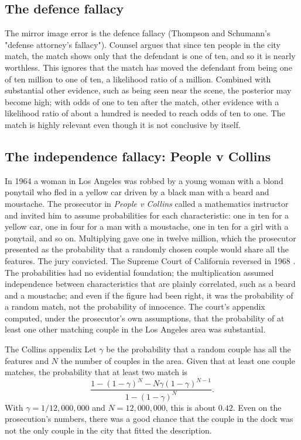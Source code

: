 \subsection{The defence fallacy}

The mirror image error is the defence fallacy (Thompson and Schumann's "defense attorney's fallacy"). Counsel argues that since ten people in the city match, the match shows only that the defendant is one of ten, and so it is nearly worthless. This ignores that the match has moved the defendant from being one of ten million to one of ten, a likelihood ratio of a million. Combined with substantial other evidence, such as being seen near the scene, the posterior may become high; with odds of one to ten after the match, other evidence with a likelihood ratio of about a hundred is needed to reach odds of ten to one. The match is highly relevant even though it is not conclusive by itself.

\subsection{The independence fallacy: People v Collins}

In 1964 a woman in Los Angeles was robbed by a young woman with a blond ponytail who fled in a yellow car driven by a black man with a beard and moustache. The prosecutor in \emph{People v Collins} called a mathematics instructor and invited him to assume probabilities for each characteristic: one in ten for a yellow car, one in four for a man with a moustache, one in ten for a girl with a ponytail, and so on. Multiplying gave one in twelve million, which the prosecutor presented as the probability that a randomly chosen couple would share all the features. The jury convicted. The Supreme Court of California reversed in 1968 \citep{collins1968}. The probabilities had no evidential foundation; the multiplication assumed independence between characteristics that are plainly correlated, such as a beard and a moustache; and even if the figure had been right, it was the probability of a random match, not the probability of innocence. The court's appendix computed, under the prosecutor's own assumptions, that the probability of at least one other matching couple in the Los Angeles area was substantial.

\begin{casebox}{The Collins appendix}
Let $\gamma$ be the probability that a random couple has all the features and $N$ the number of couples in the area. Given that at least one couple matches, the probability that at least two match is
\[
\frac{1 - (1-\gamma)^N - N\gamma(1-\gamma)^{N-1}}{1 - (1-\gamma)^N}.
\]
With $\gamma = 1/12{,}000{,}000$ and $N = 12{,}000{,}000$, this is about $0.42$. Even on the prosecution's numbers, there was a good chance that the couple in the dock was not the only couple in the city that fitted the description.
\end{casebox}

